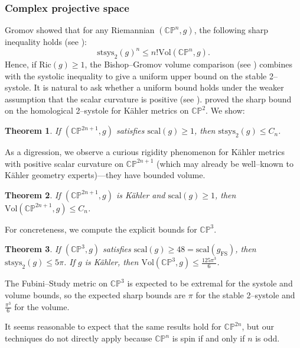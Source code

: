 \documentclass[12pt]{amsart}
\newtheorem{theorem}{Theorem}[section]
\theoremstyle{definition}
\numberwithin{equation}{section}
\newcommand{\CP}{\mathbb{C}\mathbb{P}}
\begin{document}
\subsubsection{Complex projective space}
Gromov showed that for any Riemannian $(\CP^n, g)$, the following sharp inequality holds (see \cite{Gromov:sys0, Gromov:sys1, Gromov:sys2}):
\[ \mathrm{stsys}_2(g)^n \leq n!\mathrm{Vol}(\CP^n, g). \]
Hence, if $\mathrm{Ric}(g) \geq 1$, the Bishop--Gromov volume comparison (see \cite[Lemma 7.1.4]{Petersen:geometry}) combines with the systolic inequality to give a uniform upper bound on the stable 2--systole. It is natural to ask whether a uniform bound holds under the weaker assumption that the scalar curvature is positive (see \cite[Question 6.3]{Richard-Zhu:survey}). \cite{Sha:main} proved the sharp bound on the homological 2--systole for K{\"a}hler metrics on $\CP^2$. We show:

\begin{theorem}\label{thm:cpn}
If $(\CP^{2n+1}, g)$ satisfies $\mathrm{scal}(g) \geq 1$, then $\mathrm{stsys}_2(g) \leq C_n$. 
\end{theorem}

As a digression, we observe a curious rigidity phenomenon for K{\"a}hler metrics with positive scalar curvature on $\CP^{2n+1}$ (which may already be well--known to K{\"a}hler geometry experts)---they have bounded volume.

\begin{theorem}\label{thm:cpn-kahler}
If $(\CP^{2n+1}, g)$ is K{\"a}hler and $\mathrm{scal}(g) \geq 1$, then $\mathrm{Vol}(\CP^{2n+1}, g) \leq C_n$.
\end{theorem}

For concreteness, we compute the explicit bounds for $\CP^3$.

\begin{theorem}\label{thm:cp3}
If $(\CP^3, g)$ satisfies $\mathrm{scal}(g) \geq 48 = \mathrm{scal}(g_{\mathrm{FS}})$, then $\mathrm{stsys}_2(g) \leq 5\pi$. If $g$ is K{\"a}hler, then $\mathrm{Vol}(\CP^3, g) \leq \frac{125\pi^3}{6}$.
\end{theorem}

The Fubini--Study metric on $\CP^3$ is expected to be extremal for the systole and volume bounds, so the expected sharp bounds are $\pi$ for the stable 2--systole and $\frac{\pi^3}{6}$ for the volume.

It seems reasonable to expect that the same results hold for $\CP^{2n}$, but our techniques do not directly apply because $\CP^n$ is spin if and only if $n$ is odd.
\end{document}
